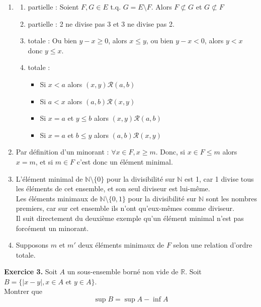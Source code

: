 \documentclass[a4paper, 10pt]{report}
\providecommand{\abs}[1]{\lvert#1\rvert}
\begin{document}
	\colorbox{solution}{\begin{minipage}{0.9\textwidth}
		\begin{enumerate}[label=\arabic*.]
			\item 
			\begin{enumerate}[label=(\alph*)]
				\item partielle : Soient $F, G \in E$ t.q. $G = E \setminus F$.
				Alors $F \not \subset G$ et $G \not \subset F$
				\item partielle : 2 ne divise pas 3 et 3 ne divise pas 2.
				\item totale : Ou bien $y - x \geq 0$, alors $x \leq y$,
				ou bien $y - x < 0$, alors $y < x$ donc $y \leq x$.
				\item totale : \begin{itemize}[label=-]
					\item Si $x < a$ alors $(x, y)\mathcal{R}(a, b)$
					\item Si $a < x$ alors $(a, b)\mathcal{R}(x, y)$
					\item Si $x = a$ et $y \leq b$ alors $(x, y)\mathcal{R}(a, b)$
					\item Si $x = a$ et $b \leq y$ alors $(a, b)\mathcal{R}(x, y)$
				\end{itemize}
			\end{enumerate}
			\item Par définition d'un minorant : $\forall x \in F, x \geq m$.
			Donc, si $x \in F \leq m$ alors $x = m$, et si $m \in F$ c'est donc
			un élément minimal. 
			\item L'élément minimal de $\mathbb{N}\setminus\{0\}$ pour la
			divisibilité sur $\mathbb{N}$ est 1, car 1 divise tous les éléments
			de cet ensemble, et son seul diviseur est lui-même.\\
			Les éléments minimaux de $\mathbb{N}\setminus\{0, 1\}$ pour la
			divisibilité sur $\mathbb{N}$ sont les nombres premiers, car sur
			cet ensemble ils n'ont qu'eux-mêmes comme diviseur.\\
			Il suit directement du deuxième exemple qu'un élément minimal n'est
			pas forcément un minorant.
			\item Supposons $m$ et $m'$ deux éléments minimaux de $F$ selon une
			relation d'ordre totale.
		\end{enumerate}
	\end{minipage}}
	
	
	\vspace{5mm}	
	\noindent
	\textbf{Exercice 3.} Soit $A$ un sous-ensemble borné non vide de 
	$\mathbb{R}$. Soit $B = \{\abs{x-y}, x \in A \text{ et } y \in A\}$.\\
	Montrer que \[\sup B = \sup A - \inf A\]
	
\end{document}
